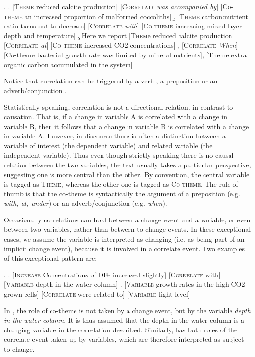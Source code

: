 \documentclass[10pt, a4paper]{article}
\newcommand{\tag}[1]{\textsc{#1}}
\begin{document}
\exi.
  \a. [\tag{Theme} reduced calcite production] [\tag{Correlate} \emph{ was accompanied by}] [\tag{Co-theme} an increased proportion of malformed coccoliths]
  \b. [\tag{Theme} carbon:nutrient ratio turns out to decrease] [\tag{Correlate}  \emph{with}] [\tag{Co-theme} increasing mixed-layer depth and temperature]
  \c. Here we report [\tag{Them}e reduced calcite production] [\tag{Correlate}  \emph{at}] [\tag{Co-theme} increased CO2 concentrations]
  \d. [\tag{Correlate} \emph{When}] [Co-theme bacterial growth rate was limited by mineral nutrients], [Theme extra organic carbon accumulated in the system]

Notice that correlation can be triggered by a verb \Last[a], a preposition \Last[b-c] or an adverb/conjunction \Last[d].

Statistically speaking, correlation is not a directional relation, in contrast to causation. That is, if a change in variable A is correlated with a change in variable B, then it follows that a change in variable B is correlated with a change in variable A. However, in discourse there is often a distinction between a variable of interest (the dependent variable) and related variable (the independent variable). 
Thus even though strictly speaking there is no causal relation between the two variables, the text usually takes a particular perspective, suggesting one is more central than the other. 
By convention, the central variable is tagged as \tag{Theme}, whereas the other one is tagged as \tag{Co-theme}. 
The rule of thumb is that the co-theme is syntactically the argument of a preposition (e.g. \emph{with, at, under}) or an adverb/conjunction (e.g. \emph{when}).  

Occasionally correlations can hold between a change event and a variable, or even between two variables, rather than between to change events.
In these exceptional cases, we assume the variable is interpreted as changing (i.e. as being part of an implicit change event), because it is involved in a correlate event.
Two examples of this exceptional pattern are: 

\exi.
  \a. [\tag{Increase} Concentrations of DFe increased slightly] [\tag{Correlate} with]  [\tag{Variable} depth in the water column]
  \b. [\tag{Variable} growth rates in the high-CO2-grown cells] [\tag{Correlate} were related to] [\tag{Variable} light level]


In \Last[a], the role of co-theme is not taken by a change event, but by the variable \emph{depth in the water column}.
It is thus assumed that the depth in the water column is a changing variable in the correlation described.
Similarly, \Last[b] has both roles of the correlate event taken up by variables, which are therefore interpreted as subject to change.
\end{document}
